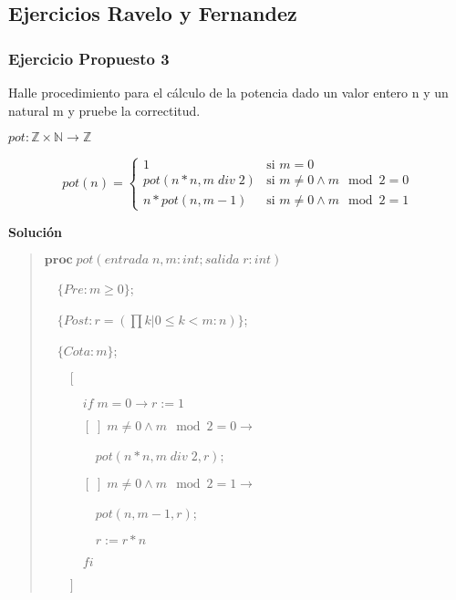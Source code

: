\documentclass[hidelinks]{article}
\newenvironment{absolutelynopagebreak}
{\Needspace{10\baselineskip}\begin{quote}}
		{\end{quote}}
\begin{document}
\newpage

\subsection{Ejercicios Ravelo y Fernandez}\par

\subsubsection{Ejercicio Propuesto 3}

Halle procedimiento para el cálculo de la potencia dado un valor entero n y un
natural m y pruebe la correctitud.\par
$pot: \mathbb{Z} \times \mathbb{N} \rightarrow \mathbb{Z} $\par
\begin{equation}
	pot(n) =
	\begin{cases}
		1                         & \text{si } m = 0                       \\
		pot(n * n, m \; div \; 2) & \text{si } m \neq 0 \land m \mod 2 = 0 \\
		n * pot(n, m - 1)         & \text{si } m \neq 0 \land m \mod 2 = 1
	\end{cases}
\end{equation} \par

\textbf{Solución}

\begin{absolutelynopagebreak}
	$\textbf{proc} \; pot(entrada \; n, m: int; salida \; r: int)$ \par
	$\quad \{Pre: m \geq 0\}$;\par
	$\quad \{Post: r = (\prod k | 0 \leq k < m: n)\}$;\par
	$\quad \{Cota: m\}$;\par
	$\qquad [$\par
			$\qquad \quad if \; m = 0 \rightarrow r := 1$\par
			$\qquad \quad [\;] \; m \neq 0 \land m \mod 2 = 0 \rightarrow $\par
			$\qquad \qquad pot(n*n, m \; div \; 2, r)$;\par
			$\qquad \quad [\;] \; m \neq 0 \land m \mod 2 = 1 \rightarrow $\par
			$\qquad \qquad pot(n, m - 1, r)$;\par
			$\qquad \qquad r := r * n$\par
			$\qquad \quad fi$\par
			$\qquad ]$\par
\end{absolutelynopagebreak}\par
\end{document}
